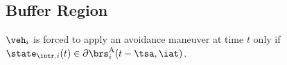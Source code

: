 \subsection{Buffer Region} \label{sec:buffRegion_case1}
$\veh_i$ is forced to apply an avoidance maneuver at time $t$ only if $\state_{\intr, i}(t) \in \partial \brs^{\text{A}}_{i}(t-\tsa, \iat)$.  


